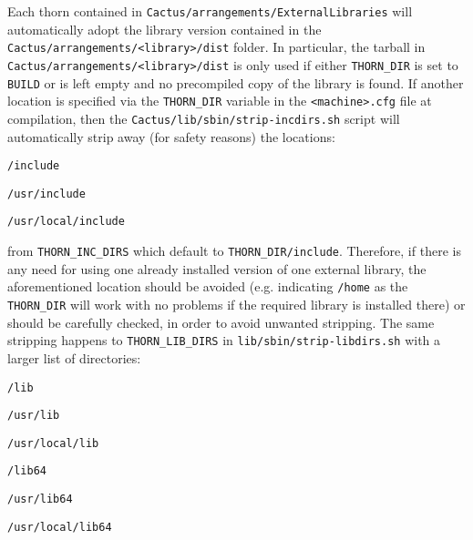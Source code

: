 Each thorn contained in \texttt{Cactus/arrangements/ExternalLibraries} will automatically adopt the library version contained in the \texttt{Cactus/arrangements/<library>/dist} folder. In particular, the tarball in \texttt{Cactus/arrangements/<library>/dist} is only used if either \texttt{THORN\_DIR} is set to \texttt{BUILD} or is left empty and no precompiled copy of the library is found. If another location is specified via the \texttt{THORN\_DIR} variable in the \texttt{<machine>.cfg} file at compilation, then the \texttt{Cactus/lib/sbin/strip-incdirs.sh} script will automatically strip away (for safety reasons) the locations:
\begin{Lentry}
\item [\texttt{/include}]
\item [\texttt{/usr/include}]
\item [\texttt{/usr/local/include}]
\end{Lentry}
from \texttt{THORN\_INC\_DIRS} which default to \texttt{THORN\_DIR/include}. Therefore, if there is any need for using one already installed version of one external library, the aforementioned location should be avoided (e.g. indicating \texttt{/home} as the \texttt{THORN\_DIR} will work with no problems if the required library is installed there) or should be carefully checked, in order to avoid unwanted stripping. The same stripping happens to \texttt{THORN\_LIB\_DIRS} in \texttt{lib/sbin/strip-libdirs.sh} with a larger list of directories:
\begin{Lentry}
\item [\texttt{/lib}]
\item [\texttt{/usr/lib}]
\item [\texttt{/usr/local/lib}]
\item [\texttt{/lib64}]
\item [\texttt{/usr/lib64}]
\item [\texttt{/usr/local/lib64}] 
\end{Lentry}



